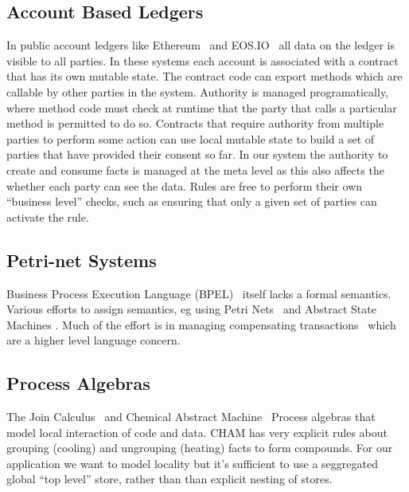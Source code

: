 \subsection{Account Based Ledgers}
In public account ledgers like Ethereum~\cite{Wood2014:Ethereum} and EOS.IO~\cite{Lee2018:EOSIO} all data on the ledger is visible to all parties. In these systems each account is associated with a contract that has its own mutable state. The contract code can export methods which are callable by other parties in the system. Authority is managed programatically, where method code must check at runtime that the party that calls a particular method is permitted to do so. Contracts that require authority from multiple parties to perform some action can use local mutable state to build a set of parties that have provided their consent so far. In our system the authority to create and consume facts is managed at the meta level as this also affects the whether each party can see the data. Rules are free to perform their own ``business level'' checks, such as ensuring that only a given set of parties can activate the rule.



\subsection{Petri-net Systems}


Business Process Execution Language (BPEL)~\cite{Andrews2003:BPEL} itself lacks a formal semantics. Various efforts to assign semantics, eg using Petri Nets~\cite{Lohmann2009:PetriBPEL} and Abstract State Machines \cite{Fahland2005:SemanticsBPEL}. Much of the effort is in managing compensating transactions~\cite{Colombo2011:Compensating} which are a higher level language concern.


\subsection{Process Algebras}
The Join Calculus~\cite{Cedric1996:Reflexive} and Chemical Abstract Machine~\cite{Berry1992:Chemical} Process algebras that model local interaction of code and data. CHAM has very explicit rules about grouping (cooling) and ungrouping (heating) facts to form compounds. For our application we want to model locality but it's sufficient to use a seggregated global ``top level'' store, rather than than explicit nesting of stores.



